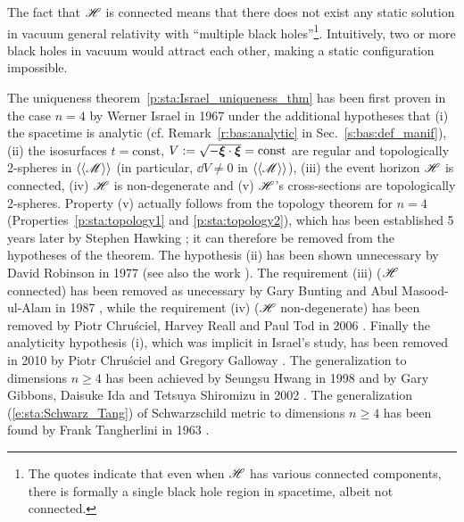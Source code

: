 \begin{remark}
The fact that $\mathscr{H}$ is connected means that there does not exist any
static solution in vacuum general relativity with ``multiple black holes''\footnote{The quotes indicate that even when $\mathscr{H}$ has various connected components, there is
formally a single black hole region in spacetime, albeit not connected.}.
Intuitively, two or more black holes in vacuum would attract each other, making a static configuration impossible.
\end{remark}

\begin{hist}
\label{h:sta:Israel_thm_vacuum}
The uniqueness theorem~\ref{p:sta:Israel_uniqueness_thm}
has been first proven in the case $n=4$ by Werner Israel
in 1967 \cite{Israe67}
under the additional hypotheses that (i) the spacetime is analytic
(cf. Remark~\ref{r:bas:analytic} in Sec.~\ref{s:bas:def_manif}),
(ii) the isosurfaces $t=\mathrm{const}$, $V := \sqrt{-\bm{\xi}\cdot\bm{\xi}} = \mathrm{const}$
are regular and topologically 2-spheres in $\langle\langle \mathscr{M}\rangle\rangle$
(in particular, $\dd V \neq 0$ in $\langle\langle \mathscr{M}\rangle\rangle$),
(iii) the event horizon $\mathscr{H}$ is connected,
(iv) $\mathscr{H}$ is non-degenerate
and (v) $\mathscr{H}$'s cross-sections are topologically 2-spheres.
Property (v)
actually follows from the topology theorem for $n=4$ (Properties~\ref{p:sta:topology1}
and \ref{p:sta:topology2}), which has been established 5 years later by Stephen Hawking \cite{Hawki72}; it can therefore be removed from the hypotheses of the theorem.
The hypothesis (ii) has been shown unnecessary by David Robinson
in 1977 \cite{Robin77}
(see also the work \cite{MulleRS73}).
The requirement (iii) ($\mathscr{H}$ connected)
has been removed as unecessary by Gary Bunting and
Abul Masood-ul-Alam in 1987 \cite{BuntiM87}, while the requirement (iv)
($\mathscr{H}$ non-degenerate) has been removed by
Piotr Chru\'sciel,
Harvey Reall and Paul Tod in 2006 \cite{ChrusRT06}.
Finally the analyticity hypothesis (i), which was implicit in Israel's study, has
been removed in 2010 by
Piotr Chru\'sciel and
Gregory Galloway \cite{ChrusG10}. The generalization to
dimensions $n\geq 4$ has been achieved by Seungsu Hwang in 1998 \cite{Hwang98}
and by Gary Gibbons, Daisuke Ida
and Tetsuya Shiromizu in 2002 \cite{GibboIS02b}.
The generalization (\ref{e:sta:Schwarz_Tang}) of Schwarzschild metric to dimensions
$n\geq 4$ has been found by
Frank Tangherlini in 1963 \cite{Tangh63}.
\end{hist}

